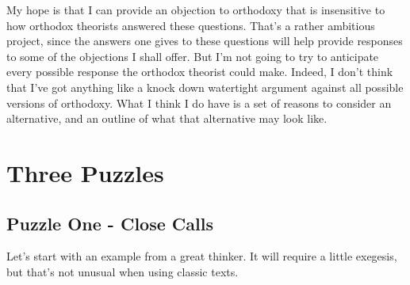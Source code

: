 \documentclass[
  11pt,
  letterpaper,
  DIV=11,
  numbers=noendperiod,
  oneside]{scrartcl}
\begin{document}
My hope is that I can provide an objection to orthodoxy that is
insensitive to how orthodox theorists answered these questions. That's a
rather ambitious project, since the answers one gives to these questions
will help provide responses to some of the objections I shall offer. But
I'm not going to try to anticipate every possible response the orthodox
theorist could make. Indeed, I don't think that I've got anything like a
knock down watertight argument against all possible versions of
orthodoxy. What I think I do have is a set of reasons to consider an
alternative, and an outline of what that alternative may look like.

\section{Three Puzzles}\label{three-puzzles}

\subsection{Puzzle One - Close Calls}\label{puzzle-one---close-calls}

Let's start with an example from a great thinker. It will require a
little exegesis, but that's not unusual when using classic texts.
\end{document}
